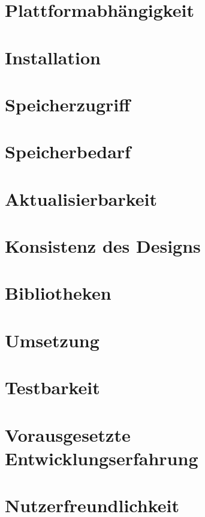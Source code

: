 \section{Plattformabhängigkeit} \label{sec:6-plattform}


\section{Installation} \label{sec:6-installation}


\section{Speicherzugriff} \label{sec:6-speicherzugriff}


\section{Speicherbedarf} \label{sec:6-speicherbedarf}


\section{Aktualisierbarkeit} \label{sec:6-aktualisierbarkeit}


\section{Konsistenz des Designs} \label{sec:6-konsistenz-des-designs}


\section{Bibliotheken} \label{sec:6-bibliotheken}


\section{Umsetzung} \label{sec:6-umsetzung}


\section{Testbarkeit} \label{sec:6-testbarkeit}


\section{Vorausgesetzte Entwicklungserfahrung} \label{sec:6-vorausgesetzte-entwicklungserfahrung}


\section{Nutzerfreundlichkeit} \label{sec:6-verstaendlichkeit}


